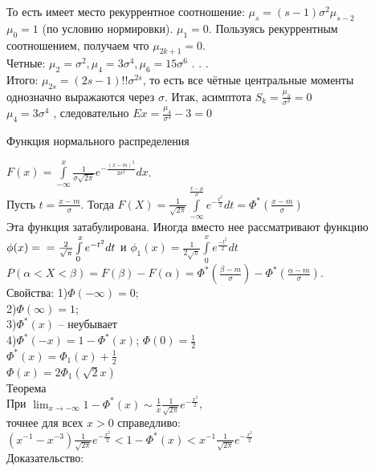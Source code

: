 \documentclass[russian, 12pt, fleqn]{article}
\begin{document}
То есть имеет место рекуррентное соотношение: $\mu_s = (s-1)\sigma^2\mu_{s-2}$\\
$\mu_0 = 1$ (по условию нормировки). $\mu_1 = 0$. Пользуясь рекуррентным соотношением, получаем что $\mu_{2k+1} = 0$.\\
Четные: $\mu_2 = \sigma^2, \mu_4 = 3\sigma^4, \mu_6 = 15\sigma^6$ . . .\\
Итого: $\mu_{2s} = (2s-1)!!\sigma^{2s}$, то есть все чётные центральные моменты однозначно выражаются через $\sigma$. Итак, асимптота $S_k = \frac{\mu_3}{\sigma^3} = 0$\\
$\mu_4 = 3\sigma^4$ , следовательно $Ex = \frac{\mu_4}{\sigma^4} - 3 = 0$
\begin{center}
$\textbf{Функция нормального распределения }$\\
\end{center}
$F(x) = \int \limits_{-\infty}^{x}\frac{1}{\sigma\sqrt{2\pi}} e^{-\frac{(x-m)^2}{2\sigma^2}}dx$.\\
Пусть $t = \frac{x-m}{\sigma}$.
Тогда $F(X) = \frac{1}{\sqrt{2\pi}}\int\limits_{-\infty}^{\frac{x-\mu}{\sigma}} e^{-\frac{t^2}{2}} dt =  \Phi^*(\frac{x-m}{\sigma})$\\
Эта функция затабулирована. Иногда вместо нее рассматривают функцию $\phi(x) =\\= \frac{2}{\sqrt{\pi}} \int\limits_{0}^{x}e^{-t^2}dt$ и $\phi_1(x) = \frac{1}{2\sqrt{\pi}} \int\limits_{0}^{x} e^{\frac{-t^2}{2}}dt$\\
$P(\alpha < X < \beta) = F(\beta) - F(\alpha) = \Phi^*(\frac{\beta - m}{\sigma}) - \Phi^*(\frac{\alpha - m}{\sigma}).$\\
Свойства:
1)$\Phi(-\infty) = 0$;\\
2)$\Phi(\infty) = 1$;\\
3)$\Phi^*(x)$ -- неубывает\\
4)$\Phi^*(-x) = 1 - \Phi^*(x)$; $\Phi(0) = \frac{1}{2}$\\
$\Phi^*(x) = \Phi_1(x) + \frac{1}{2}$\\
$\Phi(x) = 2 \Phi_1(\sqrt{2}{x})$\\
$\textbf{Теорема}$\\
При $\displaystyle{  \lim_{x\to{-\infty}}  } 1 - \Phi^*(x) \sim  \frac{1}{x} \frac{1}{\sqrt{2\pi}} e^{-\frac{x^2}{2}}  $,\\ точнее для всех $x  > 0$ справедливо:
$(x^{-1} - x^{-3})\frac{1}{\sqrt{2\pi}}e^{-\frac{x^2}{2}} < 1 - \Phi^*(x) < x^{-1}\frac{1}{\sqrt{2\pi}} e^{-\frac{x^2}{2}}$\\
Доказательство:\\
\end{document}
